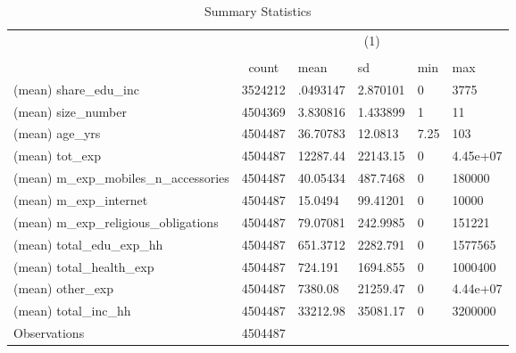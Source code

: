 \begin{table}[htbp]\centering
\def\sym#1{\ifmmode^{#1}\else\(^{#1}\)\fi}
\caption{Summary Statistics}
\begin{tabular}{l*{1}{c}}
\hline\hline
                              &                                         \\
                              &                                            \\
                              &       count&        mean&          sd&         min&         max\\
\hline
(mean) share\_edu\_inc          &     3524212&    .0493147&    2.870101&           0&        3775\\
(mean) size\_number            &     4504369&    3.830816&    1.433899&           1&          11\\
(mean) age\_yrs                &     4504487&    36.70783&     12.0813&        7.25&         103\\
(mean) tot\_exp                &     4504487&    12287.44&    22143.15&           0&    4.45e+07\\
(mean) m\_exp\_mobiles\_n\_accessories&     4504487&    40.05434&    487.7468&           0&      180000\\
(mean) m\_exp\_internet         &     4504487&     15.0494&    99.41201&           0&       10000\\
(mean) m\_exp\_religious\_obligations&     4504487&    79.07081&    242.9985&           0&      151221\\
(mean) total\_edu\_exp\_hh       &     4504487&    651.3712&    2282.791&           0&     1577565\\
(mean) total\_health\_exp       &     4504487&     724.191&    1694.855&           0&     1000400\\
(mean) other\_exp              &     4504487&     7380.08&    21259.47&           0&    4.44e+07\\
(mean) total\_inc\_hh           &     4504487&    33212.98&    35081.17&           0&     3200000\\
\hline
Observations                  &     4504487&            &            &            &            \\
\hline\hline
\end{tabular}
\end{table}

